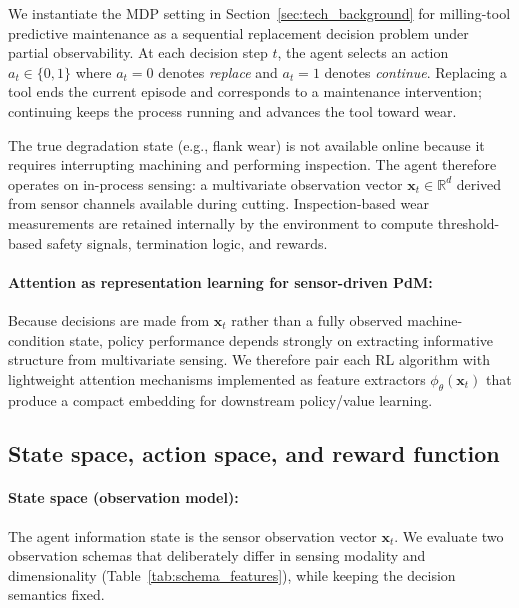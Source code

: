 \documentclass[sn-basic]{sn-jnl} %
\begin{document}
We instantiate the MDP setting in Section~\ref{sec:tech_background} for milling-tool predictive maintenance as a sequential replacement decision problem under partial observability. At each decision step $t$, the agent selects an action $a_t\in\{0,1\}$ where $a_t=0$ denotes \emph{replace} and $a_t=1$ denotes \emph{continue}. Replacing a tool ends the current episode and corresponds to a maintenance intervention; continuing keeps the process running and advances the tool toward wear.

The true degradation state (e.g., flank wear) is not available online because it requires interrupting machining and performing inspection. The agent therefore operates on in-process sensing: a multivariate observation vector $\mathbf{x}_t\in\mathbb{R}^d$ derived from sensor channels available during cutting. Inspection-based wear measurements are retained internally by the environment to compute threshold-based safety signals, termination logic, and rewards.

\paragraph{Attention as representation learning for sensor-driven PdM:}
Because decisions are made from $\mathbf{x}_t$ rather than a fully observed machine-condition state, policy performance depends strongly on extracting informative structure from multivariate sensing. We therefore pair each RL algorithm with lightweight attention mechanisms implemented as feature extractors $\phi_\theta(\mathbf{x}_t)$ that produce a compact embedding for downstream policy/value learning.

\subsection{State space, action space, and reward function}
\label{sec:mdp_components}

\paragraph{State space (observation model):}
The agent information state is the sensor observation vector $\mathbf{x}_t$. We evaluate two observation schemas that deliberately differ in sensing modality and dimensionality (Table~\ref{tab:schema_features}), while keeping the decision semantics fixed.
\end{document}
